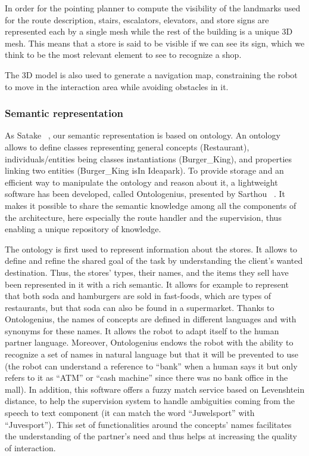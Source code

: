 \documentclass[a4paper,11pt,twoside]{StyleThese}
\begin{document}
In order for the pointing planner to compute the visibility of the landmarks used for the route description, stairs, escalators, elevators, and store signs are represented each by a single mesh while the rest of the building is a unique 3D mesh. This means that a store is said to be visible if we can see its sign, which we think to be the most relevant element to see to recognize a shop.

The 3D model is also used to generate a navigation map, constraining the robot to move in the interaction area while avoiding obstacles in it.

\subsubsection{Semantic representation}\label{subsubsec:semantic}

As Satake \etal{}~\cite{satake_2015_field}, our semantic representation is based on ontology. An ontology allows to define classes representing general concepts (\eg Restaurant), individuals/entities being classes instantiations (\eg Burger\_King), and properties linking two entities (\eg Burger\_King isIn Ideapark).
To provide storage and an efficient way to manipulate the ontology and reason about it, a lightweight software has been developed, called Ontologenius, presented by Sarthou \etal{}~\cite{sarthou_2019_ontologenius}. It makes it possible to share the semantic knowledge among all the components of the architecture, here especially the route handler and the supervision, thus enabling a unique repository of knowledge.

The ontology is first used to represent information about the stores. It allows to define and refine the shared goal of the task by understanding the client's wanted destination. Thus, the stores' types, their names, and the items they sell have been represented in it with a rich semantic. It allows for example to represent that both soda and hamburgers are sold in fast-foods, which are types of restaurants, but that soda can also be found in a supermarket. Thanks to Ontologenius, the names of concepts are defined in different languages and with synonyms for these names. It allows the robot to adapt itself to the human partner language. Moreover, Ontologenius endows the robot with the ability to recognize a set of names in natural language but that it will be prevented to use (\eg the robot can understand a reference to ``bank'' when a human says it but only refers to it as ``ATM'' or ``cash machine'' since there was no bank office in the mall). In addition, this software offers a fuzzy match service based on Levenshtein distance, to help the supervision system to handle ambiguities coming from the speech to text component (\eg it can match the word ``Juwelsport'' with ``Juvesport''). This set of functionalities around the concepts' names facilitates the understanding of the partner's need and thus helps at increasing the quality of interaction.
\end{document}
